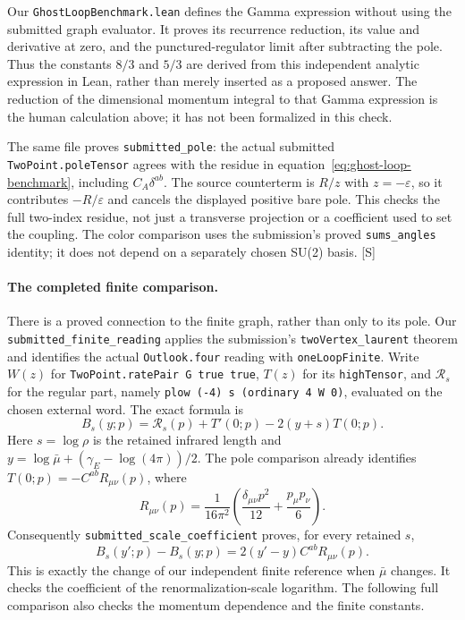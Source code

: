 \documentclass[11pt]{article}
\newcommand{\code}[1]{{\small\nolinkurl{#1}}}
\newcommand{\src}[1]{\textsf{[#1]}}
\begin{document}
Our \code{GhostLoopBenchmark.lean} defines the Gamma expression without
using the submitted graph evaluator. It proves its recurrence reduction,
its value and derivative at zero, and the punctured-regulator limit
after subtracting the pole. Thus the constants $8/3$ and $5/3$ are
derived from this independent analytic expression in Lean, rather than
merely inserted as a proposed answer. The reduction of the dimensional
momentum integral to that Gamma expression is the human calculation
above; it has not been formalized in this check.

The same file proves \code{submitted_pole}: the actual submitted
\code{TwoPoint.poleTensor} agrees with the residue in
equation~\eqref{eq:ghost-loop-benchmark}, including
$C_A\delta^{ab}$. The source counterterm is $R/z$ with $z=-\varepsilon$,
so it contributes $-R/\varepsilon$ and cancels the displayed positive
bare pole. This checks the full two-index residue, not just a transverse
projection or a coefficient used to set the coupling. The color
comparison uses the submission's proved \code{sums_angles} identity;
it does not depend on a separately chosen SU(2) basis. \src{S}

\paragraph{The completed finite comparison.}
There is a proved connection to the finite graph, rather than only to its
pole. Our \code{submitted_finite_reading} applies the submission's
\code{twoVertex_laurent} theorem and identifies the actual
\code{Outlook.four} reading with \code{oneLoopFinite}. Write $W(z)$
for \code{TwoPoint.ratePair G true true}, $T(z)$ for its
\code{highTensor}, and $\mathcal R_s$ for the regular part, namely
\code{plow (-4) s (ordinary 4 W 0)}, evaluated on the chosen external
word. The exact formula is
\begin{equation}\label{eq:retained-ghost-finite}
 B_s(y;p)=\mathcal R_s(p)+T'(0;p)-2(y+s)T(0;p).
\end{equation}
Here $s=\log\rho$ is the retained infrared length and
$y=\log\bar\mu+(\gamma_E-\log(4\pi))/2$. The pole comparison already
identifies $T(0;p)=-C^{ab}R_{\mu\nu}(p)$, where
\[
 R_{\mu\nu}(p)=\frac1{16\pi^2}
        \left(\frac{\delta_{\mu\nu}p^2}{12}
                          +\frac{p_\mu p_\nu}{6}\right).
\]
Consequently \code{submitted_scale_coefficient} proves, for every
retained $s$,
\begin{equation}\label{eq:ghost-scale-difference}
 B_s(y';p)-B_s(y;p)=2(y'-y)C^{ab}R_{\mu\nu}(p).
\end{equation}
This is exactly the change of our independent finite reference when
$\bar\mu$ changes. It checks the coefficient of the renormalization-scale
logarithm. The following full comparison also checks the momentum
dependence and the finite constants.
\end{document}
